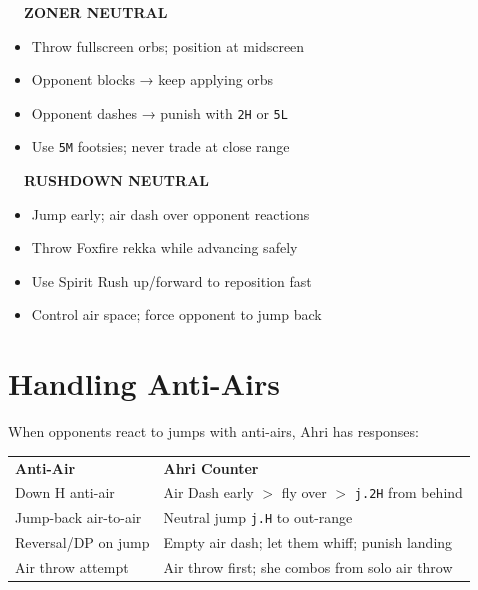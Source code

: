 \documentclass[12pt, a4paper]{report}
\newcommand{\faFistRaised}{\ding{108}}
\newcommand{\faBookOpen}{\ding{70}}
\newcommand{\notation}[1]{{\small\texttt{\textcolor{ahriCyan}{#1}}}}
\begin{document}
\begin{tcolorbox}[colback=sectionbg,colframe=ahriBlue!60,arc=5pt,boxrule=0.8pt,left=8pt,right=8pt,top=6pt,bottom=6pt]
\begin{multicols}{2}
\textcolor{ahriCyan}{\bfseries\sffamily\faBookOpen\ \ ZONER NEUTRAL}\\[4pt]
\begin{itemize}
  \item Throw fullscreen orbs; position at midscreen
  \item Opponent blocks → keep applying orbs
  \item Opponent dashes → punish with \notation{2H} or \notation{5L}
  \item Use \notation{5M} footsies; never trade at close range
\end{itemize}
\columnbreak
\textcolor{ahriMagenta}{\bfseries\sffamily\faFistRaised\ \ RUSHDOWN NEUTRAL}\\[4pt]
\begin{itemize}
  \item Jump early; air dash over opponent reactions
  \item Throw Foxfire rekka while advancing safely
  \item Use Spirit Rush up/forward to reposition fast
  \item Control air space; force opponent to jump back
\end{itemize}
\end{multicols}
\end{tcolorbox}

\section{Handling Anti-Airs}

When opponents react to jumps with anti-airs, Ahri has responses:

\begin{center}
\begin{tabular}{L{4.5cm} L{8.5cm}}
\textcolor{ahriCyan}{\textbf{Anti-Air}} & \textcolor{ahriCyan}{\textbf{Ahri Counter}} \\
Down H anti-air & Air Dash early $>$ fly over $>$ \notation{j.2H} from behind \\
Jump-back air-to-air & Neutral jump \notation{j.H} to out-range \\
Reversal/DP on jump & Empty air dash; let them whiff; punish landing \\
Air throw attempt & Air throw first; she combos from solo air throw \\
\end{tabular}
\end{center}
\end{document}
